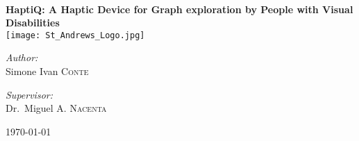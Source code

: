 
\begin{titlepage}
\begin{center}


\HRule \\[0.4cm]
{ \huge \bfseries HaptiQ: A Haptic Device for Graph exploration by People with Visual Disabilities }
\HRule \\[0.4cm]

\texttt{[image: St\_Andrews\_Logo.jpg]} %

\begin{minipage}{0.4\textwidth}
\begin{flushleft} \large
\emph{Author:}\\
Simone Ivan \textsc{Conte}
\end{flushleft}
\end{minipage}
\begin{minipage}{0.4\textwidth}
\begin{flushright} \large
\emph{Supervisor:} \\
Dr.~Miguel A. \textsc{Nacenta}
\end{flushright}
\end{minipage}

\vfill

{\large \today}

\end{center}
\end{titlepage}